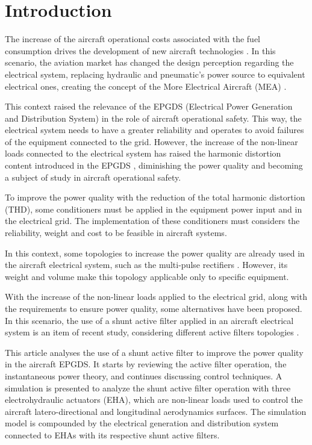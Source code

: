 \section{Introduction}

The increase of the aircraft operational costs associated with the fuel consumption drives the development of new aircraft technologies \citep{Babikian2002}. In this scenario, the aviation market has changed the design perception regarding the electrical system, replacing hydraulic and pneumatic’s power source to equivalent electrical ones, creating the concept of the More Electrical Aircraft (MEA) \citep{Moir1999}.

This context raised the relevance of the EPGDS (Electrical Power Generation and Distribution System) in the role of aircraft operational safety. This way, the electrical system needs to have a greater reliability and operates to avoid failures of the equipment connected to the grid. However, the increase of the non-linear loads connected to the electrical system has raised the harmonic distortion content introduced in the EPGDS \citep{Singer2012}, diminishing the power quality and becoming a subject of study in aircraft operational safety. 

To improve the power quality with the reduction of the total harmonic distortion (THD), some conditioners must be applied in the equipment power input and in the electrical grid. The implementation of these conditioners must considers the reliability, weight and cost to be feasible in aircraft systems.

In this context, some topologies to increase the power quality are already used in the aircraft electrical system, such as the multi-pulse rectifiers \citep{Zhu2014,Gong2003,Lobo2005}. However, its weight and volume make this topology applicable only to specific equipment.

With the increase of the non-linear loads applied to the electrical grid, along with the requirements to ensure power quality, some alternatives have been proposed. In this scenario, the use of a shunt active filter applied in an aircraft electrical system is an item of recent study, considering different active filters topologies \citep{Chen2012research,Chen2012novel,Chen2012control}.

This article analyses the use of a shunt active filter to improve the power quality in the aircraft EPGDS. It starts by reviewing the active filter operation, the instantaneous power theory, and continues discussing control techniques. A simulation is presented to analyze the shunt active filter operation with three electrohydraulic actuators (EHA), which are non-linear loads used to control the aircraft latero-directional and longitudinal aerodynamics surfaces. The simulation model is compounded by the electrical generation and distribution system connected to EHAs with its respective shunt active filters.